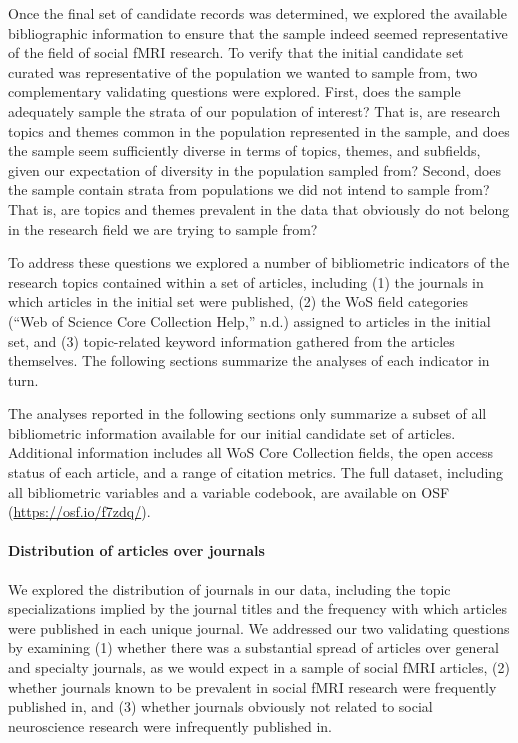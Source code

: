 \documentclass[
  english,
  man,floatsintext]{apa6}
\let\oldparagraph\paragraph
\renewcommand{\paragraph}[1]{\oldparagraph{#1}\mbox{}}
\begin{document}
Once the final set of candidate records was determined, we explored the available bibliographic information to ensure that the sample indeed seemed representative of the field of social fMRI research. To verify that the initial candidate set curated was representative of the population we wanted to sample from, two complementary validating questions were explored. First, does the sample adequately sample the strata of our population of interest? That is, are research topics and themes common in the population represented in the sample, and does the sample seem sufficiently diverse in terms of topics, themes, and subfields, given our expectation of diversity in the population sampled from? Second, does the sample contain strata from populations we did not intend to sample from? That is, are topics and themes prevalent in the data that obviously do not belong in the research field we are trying to sample from?

To address these questions we explored a number of bibliometric indicators of the research topics contained within a set of articles, including (1) the journals in which articles in the initial set were published, (2) the WoS field categories ({``Web of {Science Core Collection Help},''} n.d.) assigned to articles in the initial set, and (3) topic-related keyword information gathered from the articles themselves. The following sections summarize the analyses of each indicator in turn.

The analyses reported in the following sections only summarize a subset of all bibliometric information available for our initial candidate set of articles. Additional information includes all WoS Core Collection fields, the open access status of each article, and a range of citation metrics. The full dataset, including all bibliometric variables and a variable codebook, are available on OSF (\url{https://osf.io/f7zdq/}).

\hypertarget{distribution-of-articles-over-journals}{%
\paragraph{Distribution of articles over journals}\label{distribution-of-articles-over-journals}}

We explored the distribution of journals in our data, including the topic specializations implied by the journal titles and the frequency with which articles were published in each unique journal. We addressed our two validating questions by examining (1) whether there was a substantial spread of articles over general and specialty journals, as we would expect in a sample of social fMRI articles, (2) whether journals known to be prevalent in social fMRI research were frequently published in, and (3) whether journals obviously not related to social neuroscience research were infrequently published in.
\end{document}
